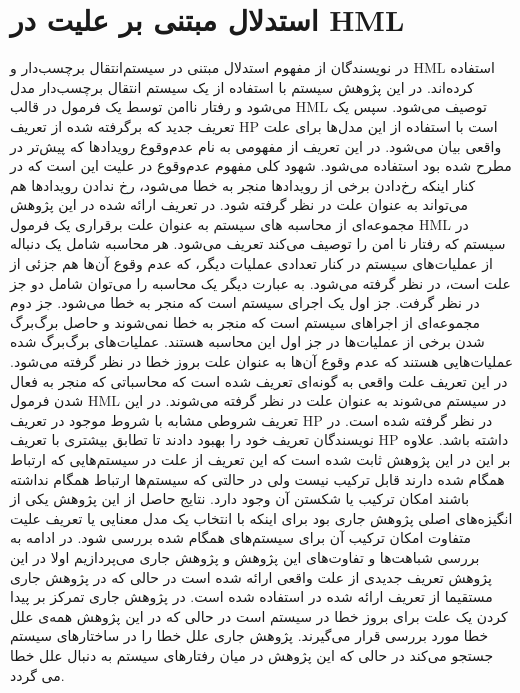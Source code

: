 \section{استدلال مبتنی بر علیت در 
HML
}
در
\cite{decomposing}
نویسندگان از مفهوم استدلال مبتنی در سیستم‌انتقال برچسب‌دار%
و 
HML%
 \cite{hml}
استفاده کرده‌اند.
در این پژوهش سیستم با استفاده از یک سیستم انتقال برچسب‌دار مدل می‌شود و رفتار ناامن توسط یک فرمول در قالب
HML
توصیف می‌شود.
سپس یک تعریف جدید که برگرفته شده از تعریف
HP
است با استفاده از این مدل‌ها برای علت واقعی بیان می‌شود.
در این تعریف از مفهومی به نام عدم‌وقوع%
رویدادها که پیش‌تر در 
\cite{causality-checking}
مطرح شده بود استفاده می‌شود.
شهود کلی مفهوم عدم‌وقوع در علیت این است که در کنار اینکه رخ‌دادن برخی از رویداد‌ها منجر به خطا می‌شود، رخ ندادن رویداد‌ها هم می‌تواند به عنوان علت در نظر گرفته شود.
در تعریف ارائه شده در این پژوهش مجموعه‌ای از محاسبه‌%
های سیستم به عنوان علت برقراری یک فرمول 
HML
در سیستم که رفتار نا امن%
را توصیف می‌کند تعریف می‌شود.
هر محاسبه شامل یک دنباله از عملیات‌های سیستم در کنار تعدادی عملیات دیگر، که عدم وقوع آن‌ها هم جزئی از علت است، در نظر گرفته می‌شود.
به عبارت دیگر یک محاسبه را می‌توان شامل دو جز در نظر گرفت.
جز اول یک اجرای سیستم است که منجر به خطا می‌شود.
جز دوم مجموعه‌ای از اجراهای سیستم‌ است که منجر به خطا نمی‌شوند و حاصل برگ‌برگ‌ شدن%
برخی از عملیات‌ها در جز اول این محاسبه هستند.
عملیات‌های برگ‌برگ شده عملیات‌هایی هستند که عدم وقوع آن‌ها به عنوان علت بروز 
خطا در نظر گرفته می‌شود.
در این تعریف علت‌ واقعی به گونه‌ای تعریف شده است که محاسباتی‌ که منجر به فعال شدن فرمول 
HML
در سیستم می‌شوند به عنوان علت در نظر گرفته می‌شوند.
در این تعریف شروطی مشابه با شروط موجود در تعریف 
HP
در نظر گرفته شده است.
در 
\cite{causal-hml}
نویسندگان تعریف خود را بهبود دادند تا تطابق بیشتری با تعریف 
HP
داشته باشد.
علاوه بر این در این پژوهش ثابت شده است که این تعریف از علت در سیستم‌هایی که ارتباط همگام%
شده دارند قابل ترکیب نیست ولی در حالتی که سیستم‌ها ارتباط همگام نداشته باشند امکان ترکیب یا شکستن آن وجود دارد.
نتایج حاصل از این پژوهش یکی از انگیزه‌های اصلی پژوهش جاری بود برای اینکه با انتخاب یک مدل معنایی یا تعریف علیت متفاوت امکان ترکیب آن برای سیستم‌های همگام شده بررسی شود.
در ادامه به بررسی شباهت‌ها و تفاوت‌های این پژوهش و پژوهش جاری می‌پردازیم
اولا در این پژوهش تعریف جدیدی از علت واقعی ارائه شده است در حالی که در پژوهش جاری مستقیما از تعریف ارائه شده در
\cite{hp}
استفاده شده است.
در پژوهش جاری تمرکز بر پیدا کردن یک علت برای بروز خطا در سیستم است در حالی که در این پژوهش همه‌ی علل خطا مورد بررسی قرار می‌گیرند.
پژوهش جاری علل خطا را در ساختار‌های سیستم جستجو می‌کند در حالی که این پژوهش در میان رفتار‌های سیستم به دنبال علل خطا می گردد.

